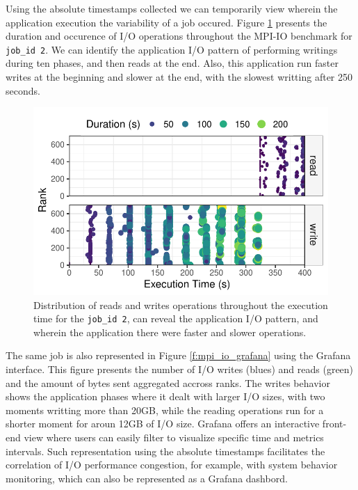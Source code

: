 Using the absolute timestamps collected we can temporarily view
wherein the application execution the variability of a job
occured. Figure \ref{f:mpi_io} presents the duration and occurence of
I/O operations throughout the MPI-IO benchmark for \texttt{job\_id
  2}. We can identify the application I/O pattern of performing
writings during ten phases, and then reads at the end. Also, this
application run faster writes at the beginning and slower at the end,
with the slowest writting after 250 seconds.
      
\begin{figure}
	\centering
	\includegraphics[width=\linewidth]{figs/255653_mpi_io_luster_no_coll_execution2.pdf}
	\caption{Distribution of reads and writes operations
          throughout the execution time for the \texttt{job\_id 2},
          can reveal the application I/O pattern, and wherein the
          application there were faster and slower operations.}
	\label{f:mpi_io}
\end{figure}

The same job is also represented in Figure \ref{f:mpi_io_grafana}
using the Grafana interface. This figure presents the number of I/O
writes (blues) and reads (green) and the amount of bytes sent
aggregated accross ranks. The writes behavior shows the application
phases where it dealt with larger I/O sizes, with two moments writting
more than 20GB, while the reading operations run for a shorter moment
for aroun 12GB of I/O size. Grafana offers an interactive front-end
view where users can easily filter to visualize specific time and
metrics intervals. Such representation using the absolute timestamps
facilitates the correlation of I/O performance congestion, for
example, with system behavior monitoring, which can also be
represented as a Grafana dashbord.

